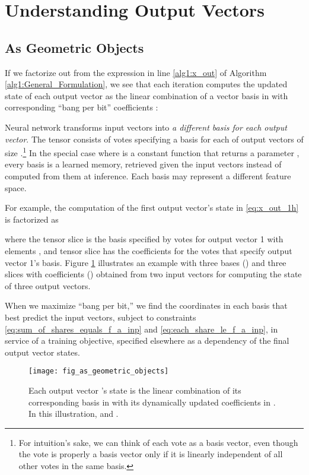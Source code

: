 \documentclass[11pt,a4paper]{article}
\begin{document}
\section{Understanding Output Vectors}\label{sec:understanding_output_vectors}

\subsection{As Geometric Objects}

If we factorize out  from the expression in line \ref{alg1:x_out} of Algorithm \ref{alg1:General_Formulation}, we see that each iteration computes the updated state of each output vector as the linear combination of a vector basis in  with corresponding ``bang per bit'' coefficients :



Neural network  transforms input vectors into {\em a different basis for each output vector}. The tensor  consists of  votes specifying a basis for each of  output vectors of size .\footnote{For intuition's sake, we can think of each vote as a basis vector, even though the vote is properly a basis vector only if it is linearly independent of all other votes in the same basis.} In the special case where  is a constant function that returns a parameter , every basis is a learned memory, retrieved given the input vectors instead of computed from them at inference. Each basis may represent a different feature space.

For example, the computation of the first output vector's state  in \eqref{eq:x_out_1h} is factorized as



where the tensor slice  is the basis specified by votes  for output vector 1 with elements , and tensor slice  has the coefficients  for the votes that specify output vector 1's basis. Figure \ref{fig:as_geometric_objects} illustrates an example with three bases () and three slices with coefficients () obtained from two input vectors for computing the state of three output vectors.

When we maximize ``bang per bit,'' we find the coordinates in each basis that best predict the input vectors, subject to constraints \eqref{eq:sum_of_shares_equals_f_a_inp} and \eqref{eq:each_share_le_f_a_inp}, in service of a training objective, specified elsewhere as a dependency of the final output vector states.


\begin{figure}[t]
	\vskip 0.1in
	\begin{center}
		\centerline{\texttt{[image: fig\_as\_geometric\_objects]}}
		\caption{Each output vector 's state is the linear combination of its corresponding basis  in  with its dynamically updated coefficients  in . In this illustration,  and .}
		\label{fig:as_geometric_objects}
	\end{center}
	\vskip -0.2in
\end{figure} 
\end{document}
